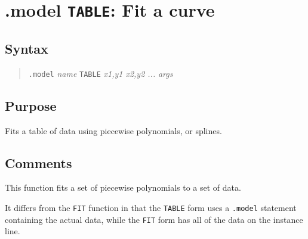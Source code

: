 %
%
%
%
\section{.model {\tt TABLE}: Fit a curve}
\subsection{Syntax}
\begin{verse}
{\tt .model} {\it name} {\tt TABLE} {\it x1,y1 x2,y2 ...} {\it args}
\end{verse}
\subsection{Purpose}

Fits a table of data using piecewise polynomials, or splines.
\subsection{Comments}

This function fits a set of piecewise polynomials to a set of data.

It differs from the {\tt FIT} function in that the {\tt TABLE} form
uses a {\tt .model} statement containing the actual data, while the
{\tt FIT} form has all of the data on the instance line.

